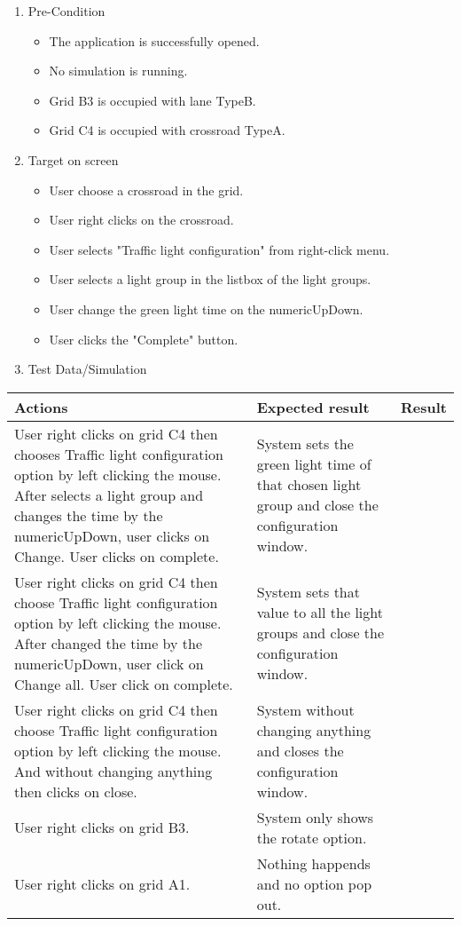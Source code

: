 \begin{enumerate}
	\item Pre-Condition
	\begin{itemize}
		\item The application is successfully opened.
		\item No simulation is running.
		\item Grid B3 is occupied with lane TypeB.
		\item Grid C4 is occupied with crossroad TypeA.
	\end{itemize}
	\item Target on screen
	\begin{itemize}
		\item User choose a crossroad in the grid.
		\item User right clicks on the crossroad.
		\item User selects "Traffic light configuration" from right-click menu.
		\item User selects a light group in the listbox of the light groups.
		\item User change the green light time on the numericUpDown.
		\item User clicks the "Complete" button. 
	\end{itemize}
	\item Test Data/Simulation
\end{enumerate}	
	\begin{tabularx}{\textwidth}{|X|X|p{2.5cm}|}\hline
		Actions & Expected result & Result \\\hline
		User right clicks on grid C4 then chooses Traffic light configuration  option by left clicking the mouse. After selects a light group and changes the time by the numericUpDown, user clicks on Change. User clicks on complete. & System sets the green light time of that chosen light group and close the configuration window.  & \pass \\\hline
		User right clicks on grid C4 then choose Traffic light configuration option by left clicking the mouse. After changed the time by the numericUpDown, user click on Change all. User click on complete. & System sets that value to all the light groups and close the configuration window. & \pass \\\hline
		User right clicks on grid C4 then choose Traffic light configuration option by left clicking the mouse. And without changing anything then clicks on close. & System without changing anything and closes the configuration window. & \pass \\\hline
		User right clicks on grid B3. & System only shows the rotate option. & \pass \\\hline
		User right clicks on grid A1. & Nothing happends and no option pop out. & \pass \\\hline
	\end{tabularx}
		


